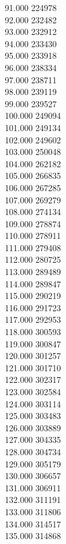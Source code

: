 { 91.000	224978 \\
 92.000	232482 \\
 93.000	232912 \\
 94.000	233430 \\
 95.000	233918 \\
 96.000	238334 \\
 97.000	238711 \\
 98.000	239119 \\
 99.000	239527 \\
 100.000	249094 \\
 101.000	249134 \\
 102.000	249602 \\
 103.000	250048 \\
 104.000	262182 \\
 105.000	266835 \\
 106.000	267285 \\
 107.000	269279 \\
 108.000	274134 \\
 109.000	278874 \\
 110.000	278911 \\
 111.000	279408 \\
 112.000	280725 \\
 113.000	289489 \\
 114.000	289847 \\
 115.000	290219 \\
 116.000	291723 \\
 117.000	292953 \\
 118.000	300593 \\
 119.000	300847 \\
 120.000	301257 \\
 121.000	301710 \\
 122.000	302317 \\
 123.000	302584 \\
 124.000	303114 \\
 125.000	303483 \\
 126.000	303889 \\
 127.000	304335 \\
 128.000	304734 \\
 129.000	305179 \\
 130.000	306657 \\
 131.000	306911 \\
 132.000	311191 \\
 133.000	311806 \\
 134.000	314517 \\
 135.000	314868 \\
}
